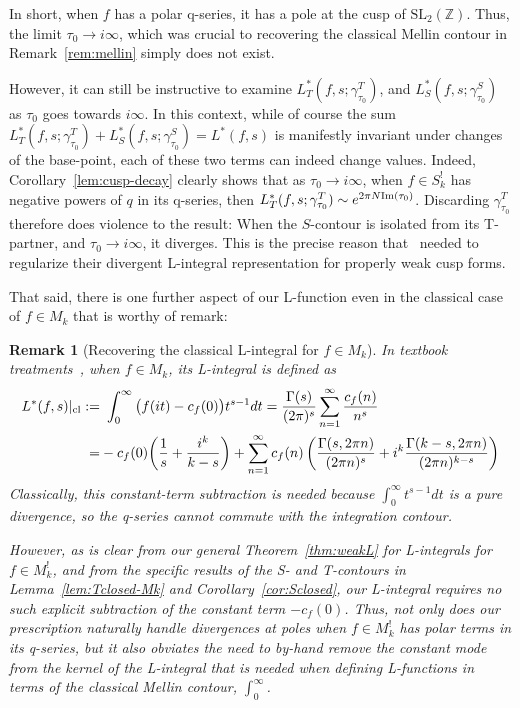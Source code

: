 \documentclass[11pt]{article}
\newtheorem{remark}[theorem]{Remark}
\newcommand{\ZZ}{\mathbb{Z}}
\newcommand{\SLZ}{\mathrm{SL}_2(\ZZ)}
\begin{document}
In short, when $f$ has a polar q-series, it has a pole at the cusp of $\SLZ$. Thus, 
the limit $\tau_0 \to i \infty$, which was crucial to recovering the classical Mellin contour 
in Remark~\ref{rem:mellin} simply does not exist.

However, it can still be instructive to examine $L^*_T(f, s; \gamma^T_{\tau_0})$, 
and $L^*_S(f, s; \gamma^S_{\tau_0})$ as $\tau_0$ goes towards $i \infty$. 
In this context, while of course the sum $L^*_T(f, s; \gamma^T_{\tau_0}) + 
L^*_S(f, s; \gamma^S_{\tau_0}) = L^*(f,s)$ is manifestly invariant under 
changes of the base-point, each of these two terms can indeed change values. Indeed, 
Corollary~\ref{lem:cusp-decay} clearly shows that as $\tau_0 \to i \infty$, when $f \in S_k^!$ 
has negative powers of $q$ in its q-series, then $L^*_T(f, s; \gamma^T_{\tau_0}) \sim 
e^{2 \pi N {\rm Im}(\tau_0)}$. Discarding $\gamma^T_{\tau_0}$ therefore does violence to the result: 
When the $S$-contour is isolated from its T-partner, and $\tau_0 \to i \infty$, it diverges. This is the precise
reason that~\cite{BFK2011} needed to regularize their divergent L-integral representation for properly weak 
cusp forms. 

That said, there is one further aspect of our L-function even in the classical 
case of $f \in M_k$ that is worthy of remark:

\begin{remark}[Recovering the classical L-integral for $f \in M_k$]\label{natural-beauty-via-finiteness}
\emph{In textbook treatments~\cite{01-Apostol}, when $f \in M_k$, its L-integral is defined as}
\begin{align}
L^*(f,s)|_{\rm cl} :=&~ \int_0^\infty \big( f(it) - c_f(0) \big) t^{s-1} dt = \frac{\Gamma(s)}{(2 \pi)^s} \sum_{n = 1}^{\infty} \frac{c_f(n)}{n^s} \\
=& -c_f(0) \bigg(\frac{1}{s} + \frac{i^k}{k-s} \bigg) + \sum_{n = 1}^{\infty} c_f(n)\left(\frac{\Gamma(s,2\pi n)}{(2\pi n)^s} + i^k \frac{\Gamma(k-s, 2\pi n)}{(2\pi n)^{k-s}}\right) \nonumber
\end{align}
\emph{Classically, this constant-term subtraction is needed because $\int_0^\infty t^{s-1} dt$ is a pure 
divergence, so the q-series cannot commute with the integration contour.}

\emph{However, as is clear from our general Theorem~\ref{thm:weakL} for L-integrals for $f \in M_k^!$, 
and from the specific results of the S- and T-contours in Lemma~\ref{lem:Tclosed-Mk} and 
Corollary~\ref{cor:Sclosed}, our L-integral requires no such explicit subtraction of the constant 
term $-c_f(0)$. Thus, not only does our prescription naturally handle divergences at poles when 
$f \in M_k^!$ has polar terms in its q-series, but it also obviates the need to by-hand remove the 
constant mode from the kernel of the L-integral that is needed when defining L-functions in terms 
of the classical Mellin contour, $\int_0^\infty$.}
\end{remark}
\end{document}
